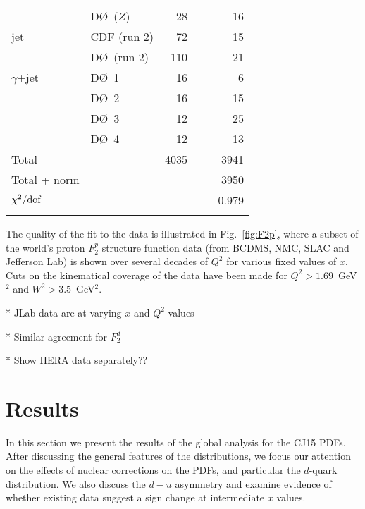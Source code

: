 \documentclass[aps,prd,amsmath,preprint]{revtex4}
\begin{document}
\begin{table}[tb]
{\begin{tabular}[c]{llrr}
  & D\O\ ($Z$)		\cite{D0Z}      &  28 &  16 \\
jet
  & CDF  (run 2)       	\cite{CDFjet2}  &  72 &  15 \\
  & D\O\ (run 2)       	\cite{D0jet2}   & 110 &  21 \\
$\gamma$+jet
  & D\O\ 1           	\cite{D0gamjet} &  16 &   6 \\    
  & D\O\ 2           	\cite{D0gamjet} &  16 &  15 \\
  & D\O\ 3           	\cite{D0gamjet} &  12 &  25 \\
  & D\O\ 4           	\cite{D0gamjet} &  12 &  13 \\ \hline
%
Total        		&		& 4035 &\ \ \ \ 3941 \\
Total + norm 		&		&      &\ \ \ \ 3950 \\ \hline
$\chi^2/{\rm dof}$	&		&      & 0.979 \\  \hline\\
%
\end{tabular}
}
\label{tab:chi2}
\end{table}


The quality of the fit to the data is illustrated in Fig.~\ref{fig:F2p},
where a subset of the world's proton $F_2^p$ structure function data
(from BCDMS, NMC, SLAC and Jefferson Lab) is shown over several decades
of $Q^2$ for various fixed values of $x$.  Cuts on the kinematical
coverage of the data have been made for $Q^2 > 1.69$~GeV$^2$ and
$W^2 > 3.5$~GeV$^2$.

* JLab data are at varying $x$ and $Q^2$ values

* Similar agreement for $F_2^d$

* Show HERA data separately??



\section{Results} 
\label{sec:results}

In this section we present the results of the global analysis for
the CJ15 PDFs.  After discussing the general features of the
distributions, we focus our attention on the effects of nuclear
corrections on the PDFs, and particular the $d$-quark distribution.
We also discuss the $\bar d-\bar u$ asymmetry and examine evidence
of whether existing data suggest a sign change at intermediate $x$
values.


\end{document}
